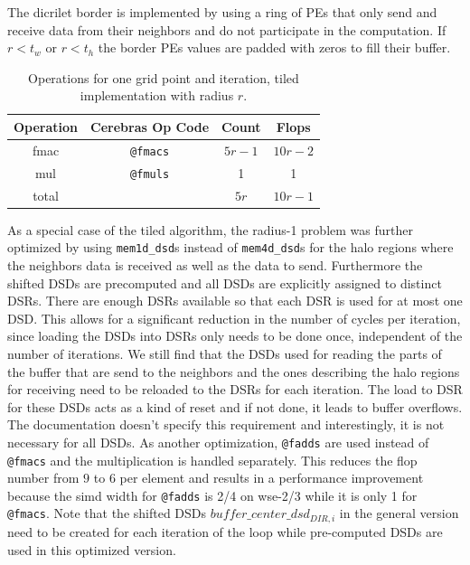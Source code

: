The dicrilet border is implemented by using a ring of PEs that only send and receive data from their neighbors and do not participate in the computation. If $r<t_w$ or $r<t_h$ the border PEs values are padded with zeros to fill their buffer.

\begin{table}[h]
    \centering
    \caption{Operations for one grid point and iteration, tiled implementation with radius $r$.}
    \label{tab:tiled_operations}
    \begin{tabular}{@{}cccc@{}}
        \toprule
        Operation & Cerebras Op Code & Count & Flops \\
        \midrule
        fmac & \texttt{@fmacs} & $5r-1$ & $10r-2$ \\
        mul & \texttt{@fmuls} & \num{1} & \num{1} \\
        \midrule
        total & & $5r$ & $10r-1$ \\
        \bottomrule
    \end{tabular}
\end{table}

As a special case of the tiled algorithm, the radius-1 problem was further optimized by using \texttt{mem1d\_dsd}s instead of \texttt{mem4d\_dsd}s for the halo regions where the neighbors data is received as well as the data to send. Furthermore the shifted DSDs are precomputed and all DSDs are explicitly assigned to distinct DSRs. There are enough DSRs available so that each DSR is used for at most one DSD. This allows for a significant reduction in the number of cycles per iteration, since loading the DSDs into DSRs only needs to be done once, independent of the number of iterations. We still find that the DSDs used for reading the parts of the buffer that are send to the neighbors and the ones describing the halo regions for receiving need to be reloaded to the DSRs for each iteration. The load to DSR for these DSDs acts as a kind of reset and if not done, it leads to buffer overflows. The documentation doesn't specify this requirement and interestingly, it is not necessary for all DSDs. 
As another optimization, \texttt{@fadds} are used instead of \texttt{@fmacs} and the multiplication is handled separately. This reduces the flop number from $9$ to $6$ per element and results in a performance improvement because the simd width for \texttt{@fadds} is 2/4 on wse-2/3 while it is only 1 for \texttt{@fmacs}. Note that the shifted DSDs $buffer\_center\_dsd_{DIR,i}$ in the general version need to be created for each iteration of the loop while pre-computed DSDs are used in this optimized version.

